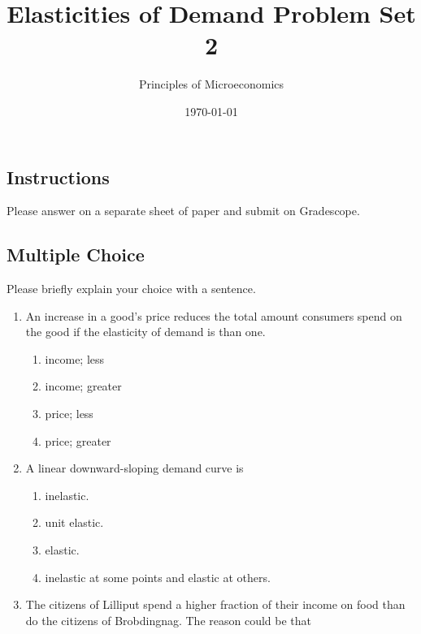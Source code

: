 \documentclass{article}
\title{Elasticities of Demand Problem Set 2}
\author{Principles of Microeconomics}
\date{\today}
\begin{document}
\maketitle

\subsection*{Instructions} Please answer on a separate sheet of paper and submit on Gradescope.

\subsection*{Multiple Choice} Please briefly explain your choice with a sentence.

\begin{enumerate}

\item An increase in a good's price reduces the total amount consumers spend on the good if the \underline{\phantom{xxxxxxxxxx}} elasticity of demand is \underline{\phantom{xxxxxxxxxx}} than one.

	\begin{enumerate}
	
	\item income; less
	
	\item income; greater
	
	\item price; less
	
	\item price; greater
	
	\end{enumerate}
	
\item A linear downward-sloping demand curve is

	\begin{enumerate}
	
	\item inelastic.
	
	\item unit elastic.
	
	\item elastic.
	
	\item inelastic at some points and elastic at others.
	
	\end{enumerate}
	
\item The citizens of Lilliput spend a higher fraction of their income on food than do the citizens of Brobdingnag. The reason could be that
	

\end{enumerate}
\end{document}
